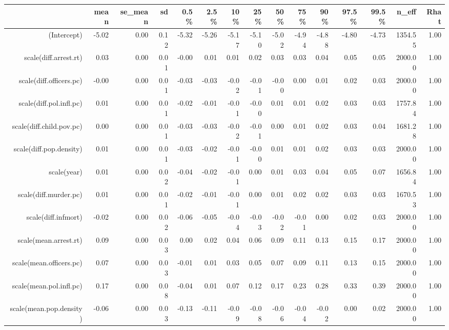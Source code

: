 \begin{table}[ht]
\centering
\begin{tabular}{rrrrrrrrrrrrrrr}
  \hline
 & mean & se\_mean & sd & 0.5\% & 2.5\% & 10\% & 25\% & 50\% & 75\% & 90\% & 97.5\% & 99.5\% & n\_eff & Rhat \\ 
  \hline
(Intercept) & -5.02 & 0.00 & 0.12 & -5.32 & -5.26 & -5.17 & -5.10 & -5.02 & -4.94 & -4.88 & -4.80 & -4.73 & 1354.55 & 1.00 \\ 
  scale(diff.arrest.rt) & 0.03 & 0.00 & 0.01 & -0.00 & 0.01 & 0.01 & 0.02 & 0.03 & 0.03 & 0.04 & 0.05 & 0.05 & 2000.00 & 1.00 \\ 
  scale(diff.officers.pc) & -0.00 & 0.00 & 0.01 & -0.03 & -0.03 & -0.02 & -0.01 & -0.00 & 0.00 & 0.01 & 0.02 & 0.03 & 2000.00 & 1.00 \\ 
  scale(diff.pol.infl.pc) & 0.01 & 0.00 & 0.01 & -0.02 & -0.01 & -0.01 & -0.00 & 0.01 & 0.01 & 0.02 & 0.03 & 0.03 & 1757.84 & 1.00 \\ 
  scale(diff.child.pov.pc) & 0.00 & 0.00 & 0.01 & -0.03 & -0.03 & -0.02 & -0.01 & 0.00 & 0.01 & 0.02 & 0.03 & 0.04 & 1681.28 & 1.00 \\ 
  scale(diff.pop.density) & 0.01 & 0.00 & 0.01 & -0.03 & -0.02 & -0.01 & -0.00 & 0.01 & 0.01 & 0.02 & 0.03 & 0.03 & 2000.00 & 1.00 \\ 
  scale(year) & 0.01 & 0.00 & 0.02 & -0.04 & -0.02 & -0.01 & 0.00 & 0.01 & 0.03 & 0.04 & 0.05 & 0.07 & 1656.84 & 1.00 \\ 
  scale(diff.murder.pc) & 0.01 & 0.00 & 0.01 & -0.02 & -0.01 & -0.01 & 0.00 & 0.01 & 0.02 & 0.02 & 0.03 & 0.03 & 1670.53 & 1.00 \\ 
  scale(diff.infmort) & -0.02 & 0.00 & 0.02 & -0.06 & -0.05 & -0.04 & -0.03 & -0.02 & -0.01 & 0.00 & 0.02 & 0.03 & 2000.00 & 1.00 \\ 
  scale(mean.arrest.rt) & 0.09 & 0.00 & 0.03 & 0.00 & 0.02 & 0.04 & 0.06 & 0.09 & 0.11 & 0.13 & 0.15 & 0.17 & 2000.00 & 1.00 \\ 
  scale(mean.officers.pc) & 0.07 & 0.00 & 0.03 & -0.01 & 0.01 & 0.03 & 0.05 & 0.07 & 0.09 & 0.11 & 0.13 & 0.15 & 2000.00 & 1.00 \\ 
  scale(mean.pol.infl.pc) & 0.17 & 0.00 & 0.08 & -0.04 & 0.01 & 0.07 & 0.12 & 0.17 & 0.23 & 0.28 & 0.33 & 0.39 & 2000.00 & 1.00 \\ 
  scale(mean.pop.density) & -0.06 & 0.00 & 0.03 & -0.13 & -0.11 & -0.09 & -0.08 & -0.06 & -0.04 & -0.02 & 0.00 & 0.02 & 2000.00 & 1.00 \\ 

\end{tabular}
\end{table}
